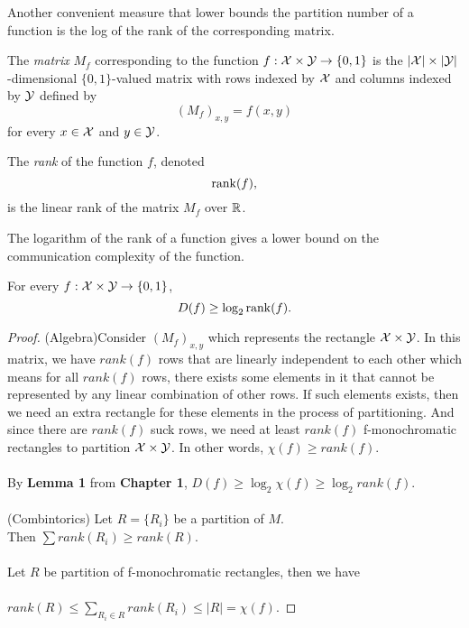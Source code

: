 Another convenient measure that lower bounds the partition number of a function is the log of the rank of the corresponding matrix.

\begin{definition}
	The \emph{matrix} $M_f$ corresponding to the function $f : \mathcal{X} \times \mathcal{Y} \to \{0,1\}$ is the $|\mathcal{X}| \times |\mathcal{Y}|$-dimensional $\{0,1\}$-valued matrix with rows indexed by $\mathcal{X}$ and columns indexed by $\mathcal{Y}$ defined by
	\[
	(M_f)_{x,y} = f(x,y)
	\]
	for every $x \in \mathcal{X}$ and $y \in \mathcal{Y}$.
\end{definition}

\begin{definition}[Rank]
	The \emph{rank} of the function $f$, denoted
	\[
	\mathrm{rank}(f),
	\] 
	is the linear rank of the matrix $M_f$ over $\mathbb{R}$.
\end{definition}

The logarithm of the rank of a function gives a lower bound on the communication complexity of the function.

\begin{lemma}
	\label{lem:logrank}
	For every $f : \mathcal{X} \times \mathcal{Y} \to \{0,1\}$,
	\[
	D(f) \ge \log_2 \mathrm{rank}(f).
	\]
\end{lemma}

\begin{proof}
	(Algebra)Consider $(M_f)_{x,y}$ which represents the rectangle $\mathcal{X} \times \mathcal{Y}$. In this matrix, we have $rank(f)$ rows that are linearly independent to each other which means for all $rank(f)$ rows, there exists some elements in it that cannot be represented by any linear combination of other rows. If such elements exists, then we need an extra rectangle for these elements in the process of partitioning. And since there are $rank(f)$ suck rows, we need at least $rank(f)$ f-monochromatic rectangles to partition $\mathcal{X} \times \mathcal{Y}$. In other words, $\chi(f) \ge rank(f)$. \\
	\\
	By \textbf{Lemma 1} from \textbf{Chapter 1}, $D(f) \ge \log_2 \chi(f) \ge \log_2 rank(f)$. \\
	\\
	(Combintorics) Let $R=\{R_i\}$ be a partition of $M$. \\
	Then $\sum rank(R_i) \ge rank(R)$.\\
	\\
	Let $R$ be partition of f-monochromatic rectangles, then we have \\
	\\
	$rank(R) \leq \sum_{R_i\in R} rank(R_i) \leq |R| = \chi(f)$.
	
\end{proof}

